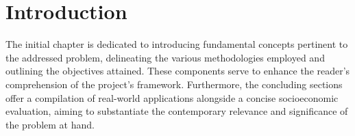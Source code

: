 \chapter{Introduction}

The initial chapter is dedicated to introducing fundamental concepts pertinent
to the addressed problem, delineating the various methodologies employed and
outlining the objectives attained. These components serve to enhance the
reader's comprehension of the project's framework. Furthermore, the concluding
sections offer a compilation of real-world applications alongside a concise
socioeconomic evaluation, aiming to substantiate the contemporary relevance and
significance of the problem at hand.





